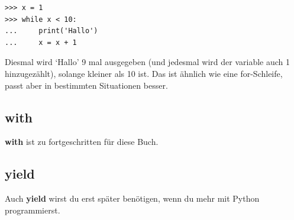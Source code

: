 \begin{Verbatim}[frame=single]
>>> x = 1
>>> while x < 10:
...     print('Hallo')
...     x = x + 1
\end{Verbatim}

Diesmal wird `Hallo' 9 mal ausgegeben (und jedesmal wird der variable  auch 1 hinzugezählt), solange  kleiner als 10 ist. Das ist ähnlich wie eine for-Schleife, passt aber in bestimmten Situationen besser.

\subsection*{with}

\textbf{with} ist zu fortgeschritten für diese Buch.

\subsection*{yield}
Auch \textbf{yield} wirst du erst später benötigen, wenn du mehr mit Python programmierst.

\newpage
